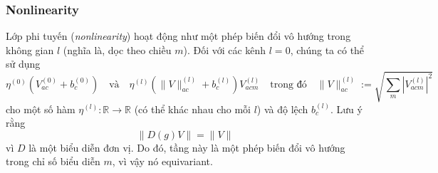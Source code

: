 \subsubsection{Nonlinearity}
Lớp phi tuyến (\textit{nonlinearity}) hoạt động như một phép biến đổi vô hướng trong không gian $l$ (nghĩa là, dọc theo chiều $m$). Đối với các kênh $l = 0$, chúng ta có thể sử dụng 
$$
\eta^{(0)}(V^{(0)}_{ac} + b^{(0)}_c) \quad \text{và} \quad \eta^{(l)}(\| V \|_{ac}^{(l)} + b^{(l)}_c)V^{(l)}_{acm} \quad \text{trong đó} \quad \| V \|_{ac}^{(l)} := \sqrt{\sum_m | V^{(l)}_{acm}|^2} 
$$ 
cho một số hàm $\eta^{(l)}: \mathbb{R} \rightarrow \mathbb{R}$ (có thể khác nhau cho mỗi $l$) và độ lệch $b^{(l)}_c$. Lưu ý rằng 
$$
\| D(g) V \| = \| V \|
$$
vì $D$ là một biểu diễn đơn vị. Do đó, tầng này là một phép biến đổi vô hướng trong chỉ số biểu diễn $m$, vì vậy nó equivariant. 